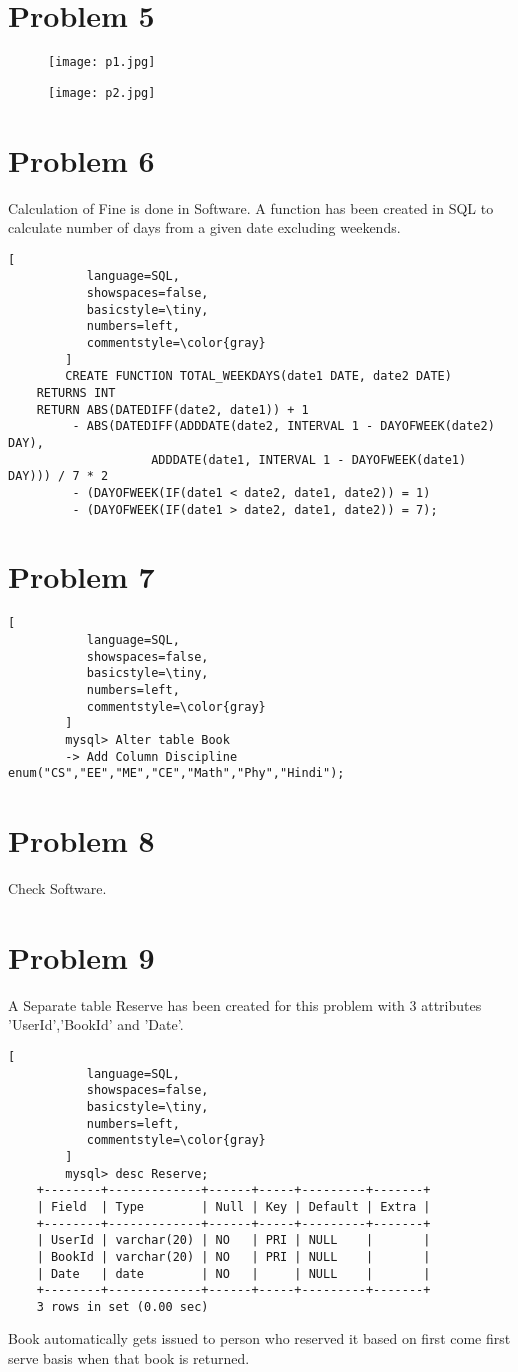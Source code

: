\documentclass[12pt]{article}
\begin{document}
\section*{Problem 5}
\begin{figure}[H]
\texttt{[image: p1.jpg]}
\end{figure}
\begin{figure}[H]
\texttt{[image: p2.jpg]}
\end{figure}
\section*{Problem 6}
Calculation of Fine is done in Software.  A function has been created in SQL to calculate number of days from a given date excluding weekends.
\begin{lstlisting}[
           language=SQL,
           showspaces=false,
           basicstyle=\tiny,
           numbers=left,
           commentstyle=\color{gray}
        ]
        CREATE FUNCTION TOTAL_WEEKDAYS(date1 DATE, date2 DATE)
	RETURNS INT
	RETURN ABS(DATEDIFF(date2, date1)) + 1
    	 - ABS(DATEDIFF(ADDDATE(date2, INTERVAL 1 - DAYOFWEEK(date2) DAY),
                    ADDDATE(date1, INTERVAL 1 - DAYOFWEEK(date1) DAY))) / 7 * 2
    	 - (DAYOFWEEK(IF(date1 < date2, date1, date2)) = 1)
    	 - (DAYOFWEEK(IF(date1 > date2, date1, date2)) = 7);
\end{lstlisting}
\section*{Problem 7}
\begin{lstlisting}[
           language=SQL,
           showspaces=false,
           basicstyle=\tiny,
           numbers=left,
           commentstyle=\color{gray}
        ]
        mysql> Alter table Book
	    -> Add Column Discipline enum("CS","EE","ME","CE","Math","Phy","Hindi");
\end{lstlisting}
\section*{Problem 8}
Check Software.
\section*{Problem 9}
A Separate table Reserve has been created for this problem with 3 attributes 'UserId','BookId' and 'Date'.
\begin{lstlisting}[
           language=SQL,
           showspaces=false,
           basicstyle=\tiny,
           numbers=left,
           commentstyle=\color{gray}
        ]
        mysql> desc Reserve;
	+--------+-------------+------+-----+---------+-------+
	| Field  | Type        | Null | Key | Default | Extra |
	+--------+-------------+------+-----+---------+-------+
	| UserId | varchar(20) | NO   | PRI | NULL    |       |
	| BookId | varchar(20) | NO   | PRI | NULL    |       |
	| Date   | date        | NO   |     | NULL    |       |
	+--------+-------------+------+-----+---------+-------+
	3 rows in set (0.00 sec)
\end{lstlisting}
Book automatically gets issued to person who reserved it based on first come first serve basis when that book is returned.
\end{document}
